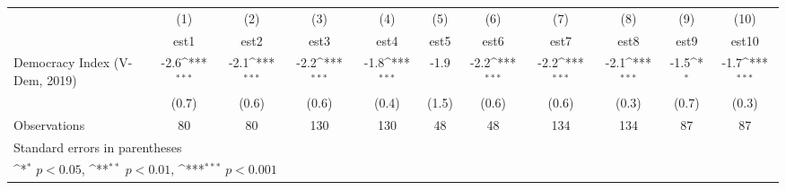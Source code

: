 {
\def\sym#1{\ifmmode^{#1}\else\(^{#1}\)\fi}
\begin{tabular}{l*{10}{c}}
\hline\hline
                    &\multicolumn{1}{c}{(1)}         &\multicolumn{1}{c}{(2)}         &\multicolumn{1}{c}{(3)}         &\multicolumn{1}{c}{(4)}         &\multicolumn{1}{c}{(5)}         &\multicolumn{1}{c}{(6)}         &\multicolumn{1}{c}{(7)}         &\multicolumn{1}{c}{(8)}         &\multicolumn{1}{c}{(9)}         &\multicolumn{1}{c}{(10)}         \\
                    &        est1         &        est2         &        est3         &        est4         &        est5         &        est6         &        est7         &        est8         &        est9         &       est10         \\
\hline
Democracy Index (V-Dem, 2019)&        -2.6\sym{***}&        -2.1\sym{***}&        -2.2\sym{***}&        -1.8\sym{***}&        -1.9         &        -2.2\sym{***}&        -2.2\sym{***}&        -2.1\sym{***}&        -1.5\sym{*}  &        -1.7\sym{***}\\
                    &       (0.7)         &       (0.6)         &       (0.6)         &       (0.4)         &       (1.5)         &       (0.6)         &       (0.6)         &       (0.3)         &       (0.7)         &       (0.3)         \\
\hline
Observations        &          80         &          80         &         130         &         130         &          48         &          48         &         134         &         134         &          87         &          87         \\
\hline\hline
\multicolumn{11}{l}{\footnotesize Standard errors in parentheses}\\
\multicolumn{11}{l}{\footnotesize \sym{*} \(p<0.05\), \sym{**} \(p<0.01\), \sym{***} \(p<0.001\)}\\
\end{tabular}
}
